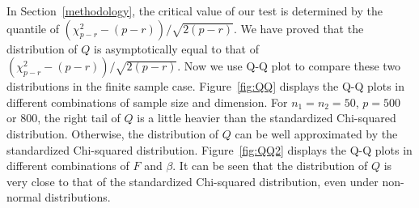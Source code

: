 \documentclass[review]{elsarticle}
\theoremstyle{plain}
\theoremstyle{definition}
\theoremstyle{remark}
\begin{document}
In Section~\ref{methodology}, the critical value of our test is determined by the quantile of $(\chi^2_{p-r}-(p-r))/\sqrt{2(p-r)}$.
We have proved that the distribution of $Q$ is asymptotically equal to that of $(\chi^2_{p-r}-(p-r))/\sqrt{2(p-r)}$.
Now we use Q-Q plot to compare these two distributions in the finite sample case.
Figure~\ref{fig:QQ} displays the Q-Q plots in different combinations of sample size and dimension.
For $n_1=n_2=50$, $p=500$ or $800$, the right tail of $Q$ is a little heavier than the standardized Chi-squared distribution.
Otherwise, the distribution of $Q$ can be well approximated by the standardized Chi-squared distribution.
Figure~\ref{fig:QQ2} displays the Q-Q plots in different combinations of $F$ and $\beta$.
It can be seen that the distribution of $Q$ is very close to that of the standardized Chi-squared distribution, even under non-normal distributions.
\end{document}
